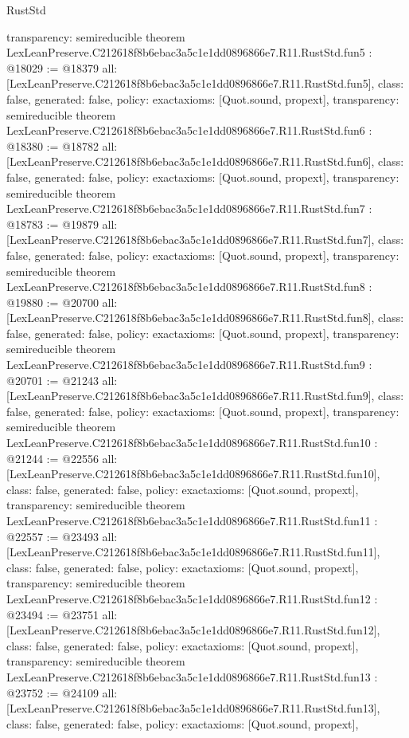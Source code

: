 \begin{lexlean}{RustStd}
\begin{coremodule}
{  transparency: semireducible
}
theorem LexLeanPreserve.C212618f8b6ebac3a5c1e1dd0896866e7.R11.RustStd.fun5 : @18029 := @18379 {
  all: [LexLeanPreserve.C212618f8b6ebac3a5c1e1dd0896866e7.R11.RustStd.fun5],
  class: false,
  generated: false,
  policy: exact{axioms: [Quot.sound, propext]},
  transparency: semireducible
}
theorem LexLeanPreserve.C212618f8b6ebac3a5c1e1dd0896866e7.R11.RustStd.fun6 : @18380 := @18782 {
  all: [LexLeanPreserve.C212618f8b6ebac3a5c1e1dd0896866e7.R11.RustStd.fun6],
  class: false,
  generated: false,
  policy: exact{axioms: [Quot.sound, propext]},
  transparency: semireducible
}
theorem LexLeanPreserve.C212618f8b6ebac3a5c1e1dd0896866e7.R11.RustStd.fun7 : @18783 := @19879 {
  all: [LexLeanPreserve.C212618f8b6ebac3a5c1e1dd0896866e7.R11.RustStd.fun7],
  class: false,
  generated: false,
  policy: exact{axioms: [Quot.sound, propext]},
  transparency: semireducible
}
theorem LexLeanPreserve.C212618f8b6ebac3a5c1e1dd0896866e7.R11.RustStd.fun8 : @19880 := @20700 {
  all: [LexLeanPreserve.C212618f8b6ebac3a5c1e1dd0896866e7.R11.RustStd.fun8],
  class: false,
  generated: false,
  policy: exact{axioms: [Quot.sound, propext]},
  transparency: semireducible
}
theorem LexLeanPreserve.C212618f8b6ebac3a5c1e1dd0896866e7.R11.RustStd.fun9 : @20701 := @21243 {
  all: [LexLeanPreserve.C212618f8b6ebac3a5c1e1dd0896866e7.R11.RustStd.fun9],
  class: false,
  generated: false,
  policy: exact{axioms: [Quot.sound, propext]},
  transparency: semireducible
}
theorem LexLeanPreserve.C212618f8b6ebac3a5c1e1dd0896866e7.R11.RustStd.fun10 : @21244 := @22556 {
  all: [LexLeanPreserve.C212618f8b6ebac3a5c1e1dd0896866e7.R11.RustStd.fun10],
  class: false,
  generated: false,
  policy: exact{axioms: [Quot.sound, propext]},
  transparency: semireducible
}
theorem LexLeanPreserve.C212618f8b6ebac3a5c1e1dd0896866e7.R11.RustStd.fun11 : @22557 := @23493 {
  all: [LexLeanPreserve.C212618f8b6ebac3a5c1e1dd0896866e7.R11.RustStd.fun11],
  class: false,
  generated: false,
  policy: exact{axioms: [Quot.sound, propext]},
  transparency: semireducible
}
theorem LexLeanPreserve.C212618f8b6ebac3a5c1e1dd0896866e7.R11.RustStd.fun12 : @23494 := @23751 {
  all: [LexLeanPreserve.C212618f8b6ebac3a5c1e1dd0896866e7.R11.RustStd.fun12],
  class: false,
  generated: false,
  policy: exact{axioms: [Quot.sound, propext]},
  transparency: semireducible
}
theorem LexLeanPreserve.C212618f8b6ebac3a5c1e1dd0896866e7.R11.RustStd.fun13 : @23752 := @24109 {
  all: [LexLeanPreserve.C212618f8b6ebac3a5c1e1dd0896866e7.R11.RustStd.fun13],
  class: false,
  generated: false,
  policy: exact{axioms: [Quot.sound, propext]},
}
\end{coremodule}
\end{lexlean}

